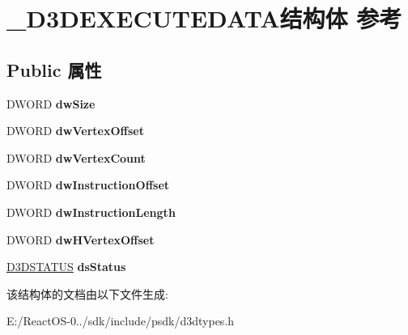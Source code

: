 \hypertarget{struct___d3_d_e_x_e_c_u_t_e_d_a_t_a}{}\section{\+\_\+\+D3\+D\+E\+X\+E\+C\+U\+T\+E\+D\+A\+T\+A结构体 参考}
\label{struct___d3_d_e_x_e_c_u_t_e_d_a_t_a}
\subsection*{Public 属性}
\begin{DoxyCompactItemize}
\item 
\mbox{\label{struct___d3_d_e_x_e_c_u_t_e_d_a_t_a_a1c82e39221791110b7def6fbd83b089a}} 
D\+W\+O\+RD {\bfseries dw\+Size}
\item 
\mbox{\label{struct___d3_d_e_x_e_c_u_t_e_d_a_t_a_a8f98fc2b5b777de075f993a206061ad0}} 
D\+W\+O\+RD {\bfseries dw\+Vertex\+Offset}
\item 
\mbox{\label{struct___d3_d_e_x_e_c_u_t_e_d_a_t_a_a8a1eb6c0251b8c0d5d86e8c50238dcfd}} 
D\+W\+O\+RD {\bfseries dw\+Vertex\+Count}
\item 
\mbox{\label{struct___d3_d_e_x_e_c_u_t_e_d_a_t_a_a23e025ad6134b02f92eeb92cc54c8c01}} 
D\+W\+O\+RD {\bfseries dw\+Instruction\+Offset}
\item 
\mbox{\label{struct___d3_d_e_x_e_c_u_t_e_d_a_t_a_a996dbdeab78ac04283c01dbff9cddc7d}} 
D\+W\+O\+RD {\bfseries dw\+Instruction\+Length}
\item 
\mbox{\label{struct___d3_d_e_x_e_c_u_t_e_d_a_t_a_aeb34fb4fbf789f017451e7bd85ef7bca}} 
D\+W\+O\+RD {\bfseries dw\+H\+Vertex\+Offset}
\item 
\mbox{\label{struct___d3_d_e_x_e_c_u_t_e_d_a_t_a_aed6d10064d7f29c5e0d6fa5b91eb44bc}} 
\hyperlink{struct___d3_d_s_t_a_t_u_s}{D3\+D\+S\+T\+A\+T\+US} {\bfseries ds\+Status}
\end{DoxyCompactItemize}


该结构体的文档由以下文件生成\+:\begin{DoxyCompactItemize}
\item 
E\+:/\+React\+O\+S-\/0../sdk/include/psdk/d3dtypes.\+h\end{DoxyCompactItemize}
